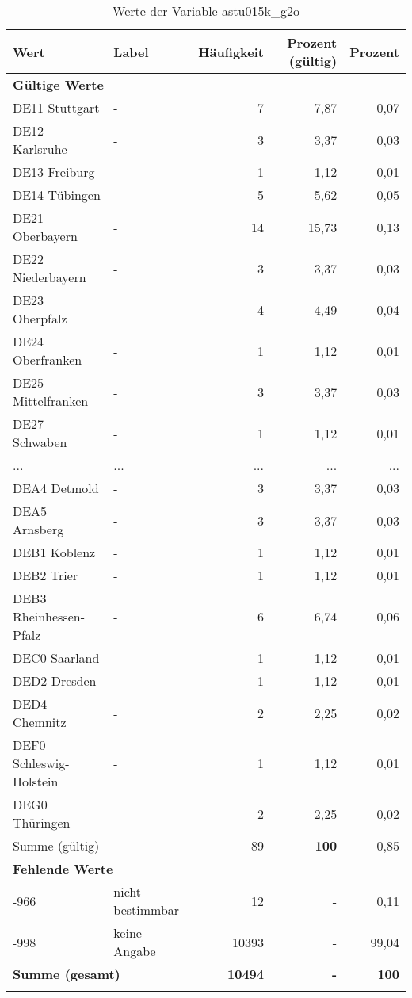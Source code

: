      \begin{longtable}{Xlrrr}
     \toprule
     \textbf{Wert} & \textbf{Label} & \textbf{Häufigkeit} & \textbf{Prozent (gültig)} & \textbf{Prozent} \\
     \endhead
     \midrule
     \multicolumn{5}{l}{\textbf{Gültige Werte}}\\
        \multicolumn{1}{X}{DE11 Stuttgart} & - & 7 & 7,87 & 0,07 \\
        \multicolumn{1}{X}{DE12 Karlsruhe} & - & 3 & 3,37 & 0,03 \\
        \multicolumn{1}{X}{DE13 Freiburg} & - & 1 & 1,12 & 0,01 \\
        \multicolumn{1}{X}{DE14 Tübingen} & - & 5 & 5,62 & 0,05 \\
        \multicolumn{1}{X}{DE21 Oberbayern} & - & 14 & 15,73 & 0,13 \\
        \multicolumn{1}{X}{DE22 Niederbayern} & - & 3 & 3,37 & 0,03 \\
        \multicolumn{1}{X}{DE23 Oberpfalz} & - & 4 & 4,49 & 0,04 \\
        \multicolumn{1}{X}{DE24 Oberfranken} & - & 1 & 1,12 & 0,01 \\
        \multicolumn{1}{X}{DE25 Mittelfranken} & - & 3 & 3,37 & 0,03 \\
        \multicolumn{1}{X}{DE27 Schwaben} & - & 1 & 1,12 & 0,01 \\
       ... & ... & ... & ... & ... \\
        \multicolumn{1}{X}{DEA4 Detmold} & - & 3 & 3,37 & 0,03 \\
        \multicolumn{1}{X}{DEA5 Arnsberg} & - & 3 & 3,37 & 0,03 \\
        \multicolumn{1}{X}{DEB1 Koblenz} & - & 1 & 1,12 & 0,01 \\
        \multicolumn{1}{X}{DEB2 Trier} & - & 1 & 1,12 & 0,01 \\
        \multicolumn{1}{X}{DEB3 Rheinhessen-Pfalz} & - & 6 & 6,74 & 0,06 \\
        \multicolumn{1}{X}{DEC0 Saarland} & - & 1 & 1,12 & 0,01 \\
        \multicolumn{1}{X}{DED2 Dresden} & - & 1 & 1,12 & 0,01 \\
        \multicolumn{1}{X}{DED4 Chemnitz} & - & 2 & 2,25 & 0,02 \\
        \multicolumn{1}{X}{DEF0 Schleswig-Holstein} & - & 1 & 1,12 & 0,01 \\
        \multicolumn{1}{X}{DEG0 Thüringen} & - & 2 & 2,25 & 0,02 \\
     \midrule
      \multicolumn{2}{l}{Summe (gültig)} & 89 &
      \textbf{100} &
         0,85 \\
     \multicolumn{5}{l}{\textbf{Fehlende Werte}}\\
       -966 & nicht bestimmbar & 12 & - & 0,11 \\

       -998 & keine Angabe & 10393 & - & 99,04 \\

     \midrule
     \multicolumn{2}{l}{\textbf{Summe (gesamt)}} & \textbf{10494} & \textbf{-} & \textbf{100} \\
     \bottomrule
     \caption{Werte der Variable astu015k\_g2o}
     \end{longtable}
     
